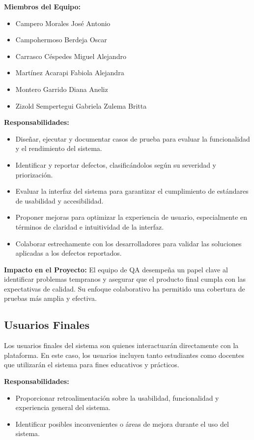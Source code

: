 \documentclass[stu, 12pt, letterpaper, donotrepeattitle, floatsintext, natbib]{apa7}
\begin{document}
\textbf{Miembros del Equipo:}
\begin{itemize}
    \item Campero Morales José Antonio
    \item Campohermoso Berdeja Oscar
    \item Carrasco Céspedes Miguel Alejandro
    \item Martínez Acarapi Fabiola Alejandra
    \item Montero Garrido Diana Aneliz
    \item Zizold Sempertegui Gabriela Zulema Britta
\end{itemize}

\textbf{Responsabilidades:}
\begin{itemize}
    \item Diseñar, ejecutar y documentar casos de prueba para evaluar la funcionalidad y el rendimiento del sistema.
    \item Identificar y reportar defectos, clasificándolos según su severidad y priorización.
    \item Evaluar la interfaz del sistema para garantizar el cumplimiento de estándares de usabilidad y accesibilidad.
    \item Proponer mejoras para optimizar la experiencia de usuario, especialmente en términos de claridad e intuitividad de la interfaz.
    \item Colaborar estrechamente con los desarrolladores para validar las soluciones aplicadas a los defectos reportados.
\end{itemize}

\textbf{Impacto en el Proyecto:}  
El equipo de QA desempeña un papel clave al identificar problemas tempranos y asegurar que el producto final cumpla con las expectativas de calidad. Su enfoque colaborativo ha permitido una cobertura de pruebas más amplia y efectiva.

\subsection{Usuarios Finales} 
Los usuarios finales del sistema son quienes interactuarán directamente con la plataforma. En este caso, los usuarios incluyen tanto estudiantes como docentes que utilizarán el sistema para fines educativos y prácticos.

\textbf{Responsabilidades:}
\begin{itemize}
    \item Proporcionar retroalimentación sobre la usabilidad, funcionalidad y experiencia general del sistema.
    \item Identificar posibles inconvenientes o áreas de mejora durante el uso del sistema.
\end{itemize}
\end{document}
